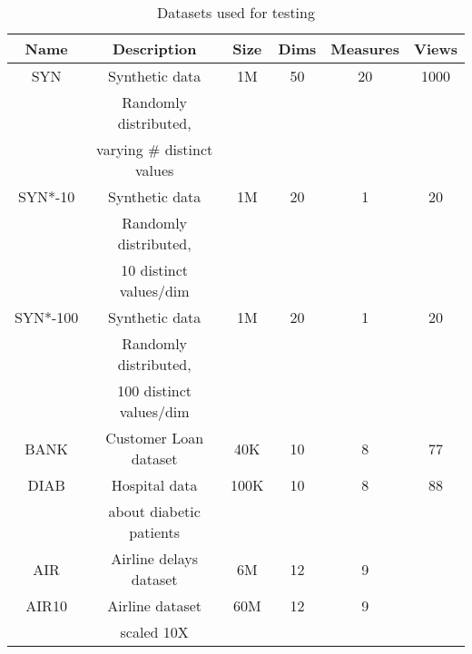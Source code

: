 \begin{table}[htb]
  \centering \scriptsize
  \begin{tabular}{|c|c|c|c|c|c|} \hline
  Name & Description & Size & Dims & Measures & Views \\ \hline
  SYN & Synthetic data & 1M & 50 & 20 & 1000 \\
  & Randomly distributed, & & & & \\ 
  & varying \# distinct values & & & & \\ \hline
  SYN*-10 & Synthetic data & 1M & 20 & 1 & 20 \\
  & Randomly distributed, & & & & \\ 
  & 10 distinct values/dim & & & & \\ \hline
  SYN*-100 & Synthetic data & 1M & 20 & 1 & 20 \\
  & Randomly distributed, & & & & \\ 
  & 100 distinct values/dim & & & & \\ \hline
  BANK  & Customer Loan dataset & 40K & 10 & 8 & 77 \\ \hline
  DIAB  & Hospital data & 100K & 10 & 8 & 88 \\
  & about diabetic patients & & & & \\ \hline
  AIR & Airline delays dataset & 6M & 12 & 9 \\ \hline
  AIR10 & Airline dataset & 60M & 12 & 9 \\ 
  & scaled 10X & & & \\ \hline
  \end{tabular}
  \vspace{-10pt}
  \caption{Datasets used for testing}
  \label{tab:datasets} 
  \vspace{-10pt}
\end{table}














